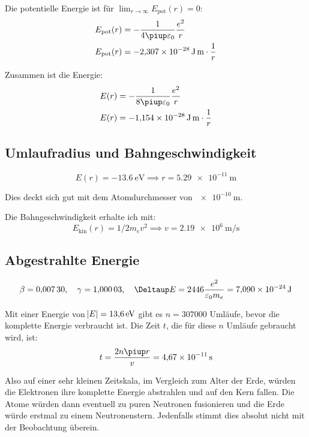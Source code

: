 Die potentielle Energie ist für $\lim_{r \to \infty} E_\text{pot}(r) = 0$:
\begin{align*}
	E_\text{pot}(r) &= - \frac{1}{4 \piup \varepsilon_0} \frac{e^2}{r} \\
	E_\text{pot}(r) &= \SI{-2.307e-28}{\joule\meter} \cdot \frac 1r
\end{align*}

Zusammen ist die Energie:
\begin{align*}
	E(r) &= - \frac{1}{8 \piup \varepsilon_0} \frac{e^2}{r} \\
	E(r) &= \SI{-1.154e-28}{\joule\meter} \cdot \frac 1r
\end{align*}


\subsection{Umlaufradius und Bahngeschwindigkeit}

\[
	E(r) = \SI{-13.6}{\electronvolt}
	\implies
	r = \SI{5.29e-11}{\meter}
\]

Dies deckt sich gut mit dem Atomdurchmesser von $\SI{e-10}{\meter}$.

Die Bahngeschwindigkeit erhalte ich mit:
\[
	E_\text{kin}(r) = 1/2 m_e v^2
	\implies
	v = \SI{2.19e6}{\meter\per\second}
\]


\subsection{Abgestrahlte Energie}

\[
	\beta = \num{0.00730}
	\eqnsep
	\gamma = \num{1.00003}
	\eqnsep
	\Deltaup E = \num{2446} \frac{e^2}{\varepsilon_0 m_e} = \SI{7.090e-24}\joule
\]

Mit einer Energie von $\abs E = \SI{13.6}\electronvolt$ gibt es $n =
\num{307000}$ Umläufe, bevor die komplette Energie verbraucht ist. Die Zeit
$t$, die für diese $n$ Umläufe gebraucht wird, ist:
\[
	t = \frac{2 n \piup r}v = \SI{4.67e-11}\second
\]

Also auf einer sehr kleinen Zeitskala, im Vergleich zum Alter der Erde, würden
die Elektronen ihre komplette Energie abstrahlen und auf den Kern fallen. Die
Atome würden dann eventuell zu puren Neutronen fusionieren und die Erde würde
erstmal zu einem Neutronenstern. Jedenfalls stimmt dies absolut nicht mit der
Beobachtung überein.


